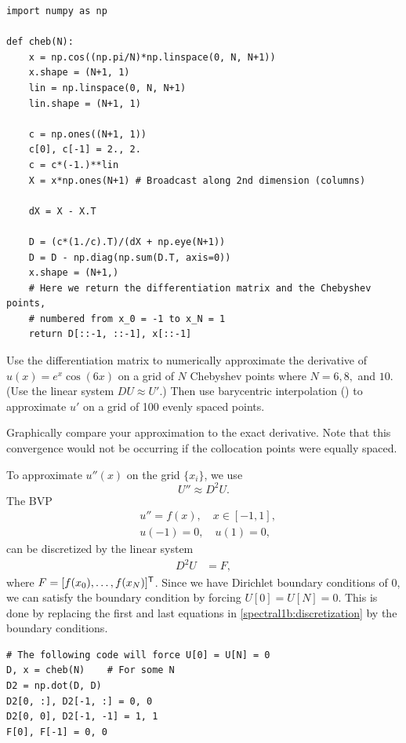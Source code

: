 \begin{lstlisting}
import numpy as np

def cheb(N):
    x = np.cos((np.pi/N)*np.linspace(0, N, N+1))
    x.shape = (N+1, 1)
    lin = np.linspace(0, N, N+1)
    lin.shape = (N+1, 1)

    c = np.ones((N+1, 1))
    c[0], c[-1] = 2., 2.
    c = c*(-1.)**lin
    X = x*np.ones(N+1) # Broadcast along 2nd dimension (columns)

    dX = X - X.T

    D = (c*(1./c).T)/(dX + np.eye(N+1))
    D = D - np.diag(np.sum(D.T, axis=0))
    x.shape = (N+1,)
    # Here we return the differentiation matrix and the Chebyshev points,
    # numbered from x_0 = -1 to x_N = 1
    return D[::-1, ::-1], x[::-1]

\end{lstlisting}

\begin{problem}
Use the differentiation matrix to numerically approximate the derivative of $u(x) = e^{x}\cos(6x)$ on a grid of $N$ Chebyshev points where $N=6, 8,$ and $10.$
(Use the linear system $D U \approx U'$.)
Then use barycentric interpolation () to approximate $u'$ on a grid of 100 evenly spaced points.

Graphically compare your approximation to the exact derivative.
Note that this convergence would not be occurring if the collocation points were equally spaced.
\end{problem}

To approximate $u''(x)$ on the grid $\{x_i\}$, we use
\begin{equation*}
	U'' \approx D^2 U.
\end{equation*}
The BVP
\begin{align*}
	&{ }u'' = f(x), \quad x \in [-1,1],\\
	&{ }u(-1) = 0, \quad u(1) = 0,
\end{align*}
can be discretized by the linear system
\begin{align}
	D^2 U &= F, 
\label{spectral1b:discretization}
\end{align}
where $F = [f(x_0),\ldots, f(x_N)]^{\mathsf T} $.
Since we have Dirichlet boundary conditions of $0$, we can satisfy the boundary condition by forcing $U[0] = U[N] = 0$.
This is done by replacing the first and last equations in \eqref{spectral1b:discretization} by the boundary conditions.

\begin{lstlisting}
# The following code will force U[0] = U[N] = 0
D, x = cheb(N)    # For some N
D2 = np.dot(D, D)
D2[0, :], D2[-1, :] = 0, 0
D2[0, 0], D2[-1, -1] = 1, 1
F[0], F[-1] = 0, 0
\end{lstlisting}


